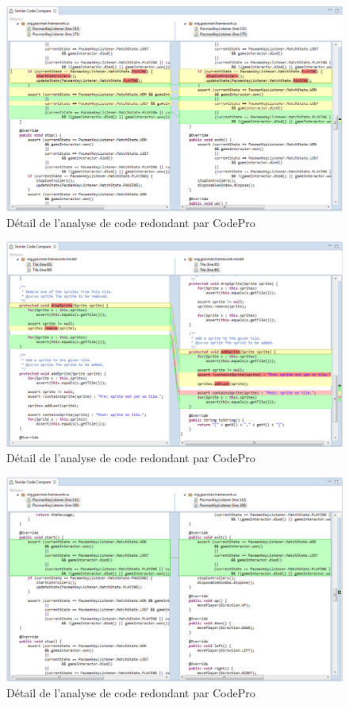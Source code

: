 \documentclass[12pt,a4paper,final]{article}
\begin{document}
\begin{figure}
	\centering
	\includegraphics[width=\textwidth]{images/SimilarCode_2.png}
	\caption{\label{SimilarCode2}Détail de l'analyse de code redondant par CodePro}
\end{figure}

\begin{figure}
	\centering
	\includegraphics[width=\textwidth]{images/SimilarCode_3.png}
	\caption{\label{SimilarCode3}Détail de l'analyse de code redondant par CodePro}
\end{figure}

\begin{figure}
	\centering
	\includegraphics[width=\textwidth]{images/SimilarCode_4.png}
	\caption{\label{SimilarCode4}Détail de l'analyse de code redondant par CodePro}
\end{figure}
\end{document}
